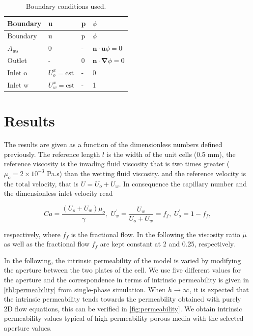 \documentclass[]{article}
\begin{document}
\begin{longtable}[]{@{}llll@{}}
\caption{Boundary conditions used. \label{tbl:BC}}\tabularnewline
\toprule
Boundary & u & p & \(\phi\)\tabularnewline
\midrule
\endfirsthead
\toprule
Boundary & u & p & \(\phi\)\tabularnewline
\midrule
\endhead
\(A_{ws}\) & 0 & - & \(\mathbf{n}\cdot\mathbf{u}\phi=0\)\tabularnewline
Outlet & - & 0 &
\(\mathbf{n}\cdot\boldsymbol{\nabla}\phi=0\)\tabularnewline
Inlet o & \(U_{o}^{x}=\mathrm{cst}\) & - & 0\tabularnewline
Inlet w & \(U_{w}^{x}=\mathrm{cst}\) & - & 1\tabularnewline
\bottomrule
\end{longtable}

\hypertarget{results}{%
\section{Results}\label{results}}

The results are given as a function of the dimensionless numbers defined
previously. The reference length \(l\) is the width of the unit cells
(0.5 mm), the reference viscosity is the invading fluid viscosity that
is two times greater (\(\mu_o=2\times 10^{-3}\) Pa.s) than the wetting
fluid viscosity. and the reference velocity is the total velocity, that
is \(U=U_{o}+U_{w}\). In consequence the capillary number and the
dimensionless inlet velocity read

\[
Ca=\frac{(U_{o}+U_{w})\mu_{o}}{\gamma},\;U_{w}^{'}=\frac{U_{w}}{U_{o}+U_{w}}=f_{f},\;U_{o}^{'}=1-f_{f},
\]

respectively, where \(f_{f}\) is the fractional flow. In the following
the viscosity ratio \(\bar{\mu}\) as well as the fractional flow
\(f_{f}\) are kept constant at 2 and 0.25, respectively.

In the following, the intrinsic permeability of the model is varied by
modifying the aperture between the two plates of the cell. We use five
different values for the aperture and the correspondence in terms of
intrinsic permeability is given in \cref{tbl:permeability} from
single-phase simulation. When \(h\rightarrow\infty\), it is expected
that the intrinsic permeability tends towards the permeability obtained
with purely 2D flow equations, this can be verified in
\cref{fig:permeability}. We obtain intrinsic permeability values typical
of high permeability porous media with the selected aperture values.
\end{document}

